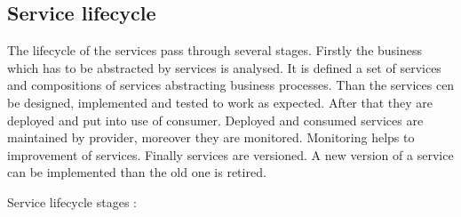 \subsection{Service lifecycle}
\label{subsec:lifecycle}
The lifecycle of the services pass through several stages. Firstly the business which has to be abstracted by services is analysed. It is defined a set of services and compositions of services abstracting business processes. Than the services cen be designed, implemented and tested to work as expected. After that they are deployed and put into use of consumer. Deployed and consumed services are maintained by provider, moreover they are monitored. Monitoring helps to improvement of services. Finally services are versioned. A new version of a service can be implemented than the old one is retired.

Service lifecycle stages \cite{soa-governance}:
